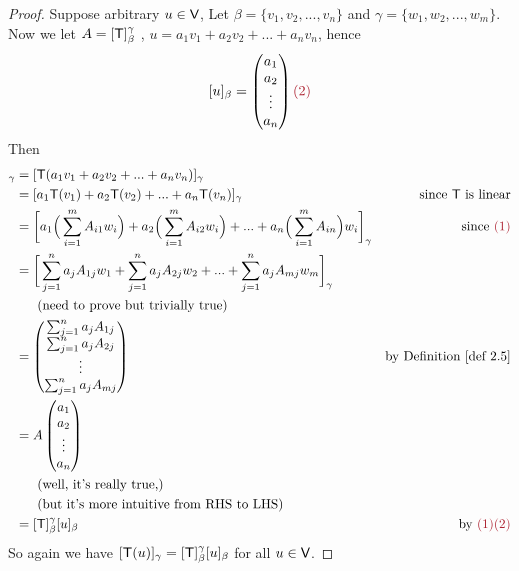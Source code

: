 \begin{proof}
Suppose arbitrary \(u \in \textsf{V}\), Let \(\beta = \{ v_1, v_2, ..., v_n \}\) and \(\gamma = \{ w_1, w_2, ..., w_m \}\).
Now we let \(A = [\textsf{T}]_{\beta}^{\gamma}\) , \(u = a_1 v_1 + a_2 v_2 + ... + a_n v_n\), hence
\[
    [u]_{\beta} = \begin{pmatrix}
        a_1 \\ a_2 \\ \vdots \\ a_n
    \end{pmatrix} \MAROON{(2)}
\]
Then
\begin{align*}
    [\T(u)]_{\gamma} & = [\T(a_1 v_1 + a_2 v_2 + ... + a_n v_n)]_{\gamma} \\
                     & = [a_1\T(v_1) + a_2\T(v_2) + ... + a_n\T(v_n)]_{\gamma} & \text{since \(\T\) is linear} \\
                     & = \bigg[
                            a_1 \Big(\sum_{i = 1}^m A_{i1} w_i \Big)
                            + a_2 \Big(\sum_{i = 1}^m A_{i2} w_i \Big)
                            + ...
                            + a_n \Big(\sum_{i = 1}^m A_{in} \Big) w_i
                         \bigg]_{\gamma} & \text{since \MAROON{(1)}} \\
                     & = \bigg[
                            \sum_{j = 1}^n a_j A_{1j} w_1
                            + \sum_{j = 1}^n a_j A_{2j} w_2
                            + ...
                            + \sum_{j = 1}^n a_j A_{mj} w_m
                         \bigg]_{\gamma} \\
                     & \text{\ \ \ \ \ (need to prove but trivially true)} \\
                     & = \begin{pmatrix}
                            \sum_{j = 1}^n a_j A_{1j} \\
                            \sum_{j = 1}^n a_j A_{2j} \\
                            \vdots \\
                            \sum_{j = 1}^n a_j A_{mj}
                     \end{pmatrix} & \text{by \DEF{2.5}} \\
                     & = A \begin{pmatrix}
                        a_1 \\
                        a_2 \\
                        \vdots \\
                        a_n
                     \end{pmatrix} & \\
                     & \text{\ \ \ \ \ (well, it's really true,)} \\
                     & \text{\ \ \ \ \ (but it's more intuitive from RHS to LHS)} \\
                     & = [\T]_{\beta}^{\gamma} [u]_{\beta} & \text{by \MAROON{(1)(2)}}
\end{align*}
So again we have \([\textsf{T}(u)]_{\gamma} = [\textsf{T}]_{\beta}^{\gamma}[u]_{\beta}\) for all \(u \in \textsf{V}\).
\end{proof}

